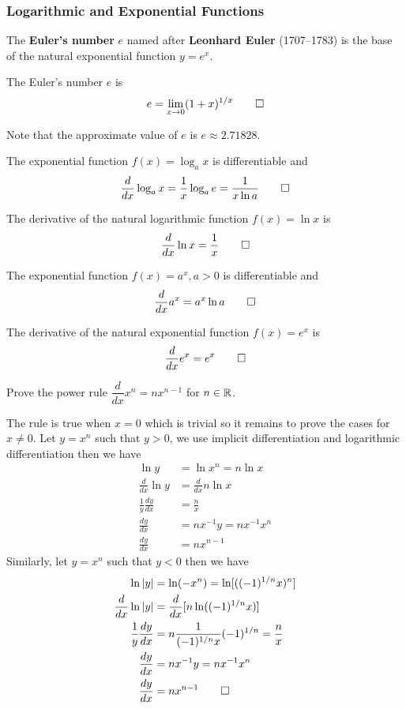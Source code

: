 \subsubsection{Logarithmic and Exponential Functions}
The \textbf{Euler's number} \(e\) named after \textbf{Leonhard Euler} (1707--1783)
is the base of the natural exponential function \(y=e^x\).
\begin{definition}
    The Euler's number \(e\) is \[e=\lim_{x\to 0}(1+x)^{1/x}\qedhere\]
\end{definition}
Note that the approximate value of \(e\) is \(e\approx2.71828\).
\begin{theorem}
    The exponential function \(f(x)=\log_a x\) is differentiable and
    \[\frac{d}{dx}\log_a x=\frac{1}{x}\log_a e=\frac{1}{x\ln a}\qedhere\]
\end{theorem}
\begin{theorem}
    The derivative of the natural logarithmic function \(f(x)=\ln x\) is
    \[\frac{d}{dx}\ln x=\frac{1}{x}\qedhere\]
\end{theorem}
\begin{theorem}
    The exponential function \(f(x)=a^x,a>0\) is differentiable and
    \[\frac{d}{dx}a^x=a^x\ln a\qedhere\]
\end{theorem}
\begin{theorem}
    The derivative of the natural exponential function \(f(x)=e^x\) is
    \[\frac{d}{dx}e^x=e^x\qedhere\]
\end{theorem}
\begin{problem}
    Prove the power rule \(\dfrac{d}{dx}x^n=nx^{n-1}\) for \(n\in\mathbb{R}\).
\end{problem}
\begin{solution}
    The rule is true when \(x=0\) which is trivial so it remains to prove the
    cases for \(x\neq 0\).
    Let \(y=x^n\) such that \(y>0\), we use implicit differentiation and
    logarithmic differentiation then we have
    \begin{align*}
        \ln y &= \ln x^n=n\ln x \\ \frac{d}{dx}\ln y &= \frac{d}{dx}n\ln x \\
        \frac{1}{y}\frac{dy}{dx} &= \frac{n}{x} \\
        \frac{dy}{dx} &= nx^{-1}y= nx^{-1}x^n \\ \frac{dy}{dx} &= nx^{n-1}
    \end{align*}
    Similarly, let \(y=x^n\) such that \(y<0\) then we have
    \begin{align*}
        \ln|y| &= \ln(-x^n)=\ln[((-1)^{1/n}x)^n] \\
        \frac{d}{dx}\ln|y| &= \frac{d}{dx}[n\ln((-1)^{1/n}x)] \\
        \frac{1}{y}\frac{dy}{dx} &= n\frac{1}{(-1)^{1/n}x}(-1)^{1/n}
        =\frac{n}{x} \\ \frac{dy}{dx} &= nx^{-1}y= nx^{-1}x^n \\
        \frac{dy}{dx} &= nx^{n-1} \qedhere
    \end{align*}
\end{solution}

